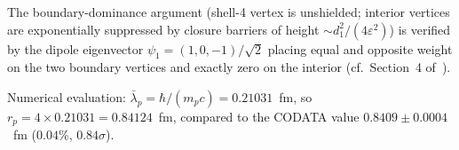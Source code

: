 \documentclass[12pt]{article}
\newcommand{\lbar}{\bar{\lambda}}
\begin{document}
The boundary-dominance argument (shell-4 vertex is unshielded; interior
vertices are exponentially suppressed by closure barriers of height
$\sim d_1^2/(4\varepsilon^2)$) is verified by the dipole eigenvector
$\psi_1 = (1, 0, -1)/\sqrt{2}$ placing equal and opposite weight on the
two boundary vertices and exactly zero on the interior
(cf.\ Section~4 of~\citep{SmartRadius}).

Numerical evaluation: $\lbar_p = \hbar/(m_p c) = 0.21031$~fm, so
$r_p = 4 \times 0.21031 = 0.84124$~fm, compared to the CODATA value
$0.8409 \pm 0.0004$~fm ($0.04\%$, $0.84\sigma$).



\end{document}
